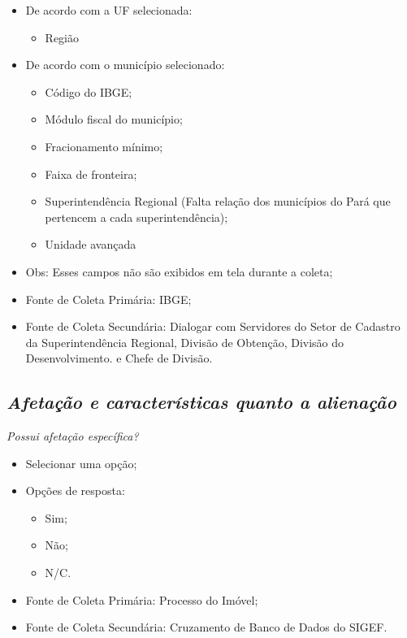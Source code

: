 \documentclass[
  letterpaper,
]{report}
\providecommand{\tightlist}{%
  \setlength{\itemsep}{0pt}\setlength{\parskip}{0pt}}\usepackage{longtable,booktabs,array}
\begin{document}
\begin{itemize}
\tightlist
\item
  De acordo com a UF selecionada:

  \begin{itemize}
  \tightlist
  \item
    Região
  \end{itemize}
\item
  De acordo com o município selecionado:

  \begin{itemize}
  \tightlist
  \item
    Código do IBGE;
  \item
    Módulo fiscal do município;
  \item
    Fracionamento mínimo;
  \item
    Faixa de fronteira;
  \item
    Superintendência Regional (Falta relação dos municípios do Pará que
    pertencem a cada superintendência);
  \item
    Unidade avançada
  \end{itemize}
\item
  Obs: Esses campos não são exibidos em tela durante a coleta;
\item
  Fonte de Coleta Primária: IBGE;
\item
  Fonte de Coleta Secundária: Dialogar com Servidores do Setor de
  Cadastro da Superintendência Regional, Divisão de Obtenção, Divisão do
  Desenvolvimento. e Chefe de Divisão.
\end{itemize}

\hypertarget{afetauxe7uxe3o-e-caracteruxedsticas-quanto-a-alienauxe7uxe3o}{%
\subsection{\texorpdfstring{\emph{Afetação e características quanto a
alienação}}{Afetação e características quanto a alienação}}\label{afetauxe7uxe3o-e-caracteruxedsticas-quanto-a-alienauxe7uxe3o}}

\emph{Possui afetação específica?}

\begin{itemize}
\tightlist
\item
  Selecionar uma opção;
\item
  Opções de resposta:

  \begin{itemize}
  \tightlist
  \item
    Sim;
  \item
    Não;
  \item
    N/C.
  \end{itemize}
\item
  Fonte de Coleta Primária: Processo do Imóvel;
\item
  Fonte de Coleta Secundária: Cruzamento de Banco de Dados do SIGEF.
\end{itemize}
\end{document}
